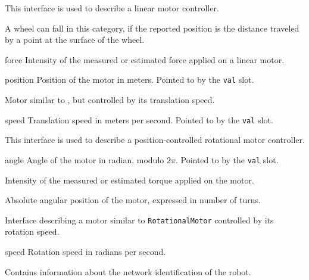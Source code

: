 This interface is used to describe a linear motor controller.

A wheel can fall in this category, if the reported position is the distance
traveled by a point at the surface of the wheel.

\begin{urbiscriptapi}
\item[force] Intensity of the measured or estimated force applied on a
  linear motor.


\item[position] Position of the motor in meters.  Pointed to by the
  \lstinline{val} slot.
\end{urbiscriptapi}


Motor similar to , but controlled by its
translation speed.

\begin{urbiscriptapi}
\item[speed] Translation speed in meters per second. Pointed to by the
  \lstinline{val} slot.
\end{urbiscriptapi}


This interface is used to describe a position-controlled rotational motor
controller.

\begin{urbiscriptapi}
\item[angle] Angle of the motor in radian, modulo $2\pi$. Pointed to by the
  \lstinline{val} slot.


\item[torque] Intensity of the measured or estimated torque applied on the
  motor.


\item[turn] Absolute angular position of the motor, expressed in number of
  turns.
\end{urbiscriptapi}


Interface describing a motor similar to \lstinline{RotationalMotor}
controlled by its rotation speed.

\begin{urbiscriptapi}
\item[speed] Rotation speed in radians per second.
\end{urbiscriptapi}


Contains information about the network identification of the robot.

